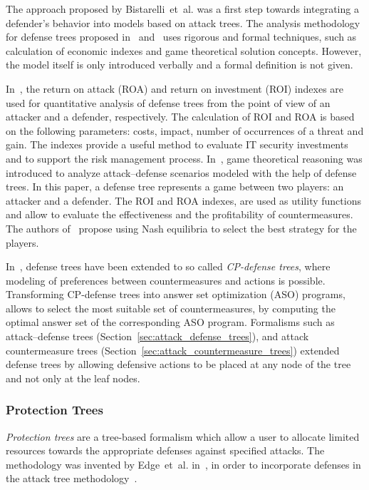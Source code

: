 \documentclass[a4paper]{article}
\begin{document}
The approach proposed by Bistarelli~et~al. was a first step towards integrating
a defender's behavior into models based on attack trees. The analysis
methodology for defense trees proposed in~\cite{BiFiPe} and~\cite{BiDaPe} uses
rigorous and formal techniques, such as calculation of economic indexes and game
theoretical solution concepts. However, the model itself is only introduced
verbally and a formal definition is not given.

In~\cite{BiFiPe}, the return on attack (ROA) and return on investment (ROI)
indexes are used for quantitative analysis of defense trees from the point of
view of an attacker and a defender, respectively. The calculation of ROI and ROA
is based on the following parameters: costs, impact, number of occurrences of a
threat and gain. The indexes provide a useful method to evaluate IT security
investments and to support the risk management process. In~\cite{BiDaPe}, game
theoretical reasoning was introduced to analyze attack--defense scenarios
modeled with the help of defense trees. In this paper, a defense tree represents
a game between two players: an attacker and a defender. The ROI and ROA indexes,
are used as utility functions and allow to evaluate the effectiveness and the
profitability of countermeasures. The authors of~\cite{BiDaPe} propose using
Nash equilibria to select the best strategy for the players.

In~\cite{BiPeTr}, defense trees have been extended to so called \emph{CP-defense
trees}, where modeling of preferences between countermeasures and actions is
possible. Transforming CP-defense trees into answer set optimization (ASO)
programs, allows to select the most suitable set of countermeasures, by
computing the optimal answer set of the corresponding ASO program. Formalisms
such as attack--defense trees  (Section~\ref{sec:attack_defense_trees}), and
attack countermeasure trees (Section~\ref{sec:attack_countermeasure_trees})
extended defense trees by allowing defensive actions to be placed at any node of
the tree and not only at the leaf nodes.

\subsubsection{Protection Trees} 
\label{sec:protection_trees}

\emph{Protection trees} are a tree-based formalism which allow a user to
allocate limited resources towards the appropriate defenses against specified 
attacks. The methodology was invented by Edge~et~al. in~, in order to
incorporate defenses in the attack tree methodology~\cite{EdDaRaMi}.
\end{document}
